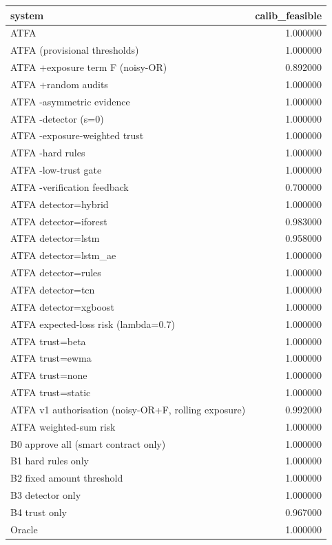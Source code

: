 \begin{tabular}{lr}
\toprule
system & calib\_feasible \\
\midrule
ATFA & 1.000000 \\
ATFA (provisional thresholds) & 1.000000 \\
ATFA +exposure term F (noisy-OR) & 0.892000 \\
ATFA +random audits & 1.000000 \\
ATFA -asymmetric evidence & 1.000000 \\
ATFA -detector (s=0) & 1.000000 \\
ATFA -exposure-weighted trust & 1.000000 \\
ATFA -hard rules & 1.000000 \\
ATFA -low-trust gate & 1.000000 \\
ATFA -verification feedback & 0.700000 \\
ATFA detector=hybrid & 1.000000 \\
ATFA detector=iforest & 0.983000 \\
ATFA detector=lstm & 0.958000 \\
ATFA detector=lstm\_ae & 1.000000 \\
ATFA detector=rules & 1.000000 \\
ATFA detector=tcn & 1.000000 \\
ATFA detector=xgboost & 1.000000 \\
ATFA expected-loss risk (lambda=0.7) & 1.000000 \\
ATFA trust=beta & 1.000000 \\
ATFA trust=ewma & 1.000000 \\
ATFA trust=none & 1.000000 \\
ATFA trust=static & 1.000000 \\
ATFA v1 authorisation (noisy-OR+F, rolling exposure) & 0.992000 \\
ATFA weighted-sum risk & 1.000000 \\
B0 approve all (smart contract only) & 1.000000 \\
B1 hard rules only & 1.000000 \\
B2 fixed amount threshold & 1.000000 \\
B3 detector only & 1.000000 \\
B4 trust only & 0.967000 \\
Oracle & 1.000000 \\
\bottomrule
\end{tabular}

